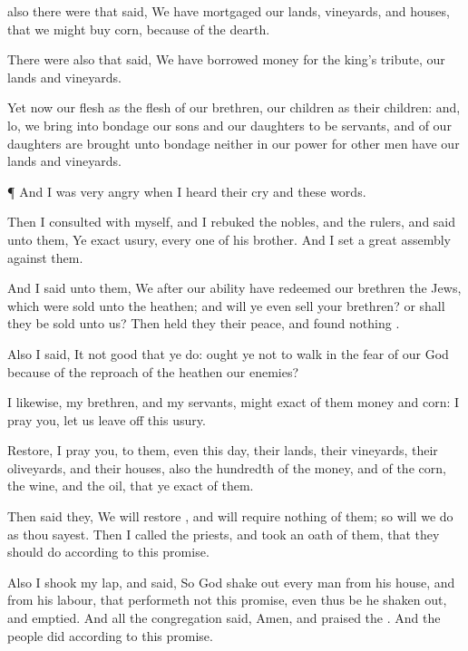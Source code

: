 { also there
were that
said, We have
mortgaged our
lands,
vineyards, and
houses, that we might
buy
corn, because of the
dearth.

There
were also that
said, We have
borrowed
money for the
king’s
tribute,
{} our
lands and
vineyards.

Yet now our
flesh
{} as the
flesh of our
brethren, our
children as their
children: and, lo, we bring into
bondage our
sons and our
daughters to be
servants, and
{} of our
daughters
are brought unto
bondage
{} neither
{} in our
power
{} for other
men have our
lands and
vineyards.


\par }{\PP {}¶ And I was
very
angry when I
heard their
cry and these
words.

Then I
consulted with
myself, and I
rebuked the
nobles, and the
rulers, and
said unto them, Ye
exact
usury, every
one of his
brother. And I
set a
great
assembly against them.

And I
said unto them, We after our
ability have
redeemed our
brethren the
Jews, which were
sold unto the
heathen; and will ye even
sell your
brethren? or shall they be
sold unto us? Then held they their
peace, and
found
nothing
{}.

Also I
said, It
{} not
good
that ye
do: ought ye not to
walk in the
fear of our
God because of the
reproach of the
heathen our
enemies?

I likewise,
{} my
brethren, and my
servants, might
exact of them
money and
corn: I pray you, let us leave
off this
usury.

Restore, I pray you, to them, even this
day, their
lands, their
vineyards, their
oliveyards, and their
houses, also the
hundredth
{} of the
money, and of the
corn, the
wine, and the
oil, that ye
exact of them.

Then
said they, We will
restore
{}, and will
require nothing of them; so will we
do as thou
sayest. Then I
called the
priests, and took an
oath of them, that they should
do according to this
promise.

Also I
shook my
lap, and
said, So
God shake
out every
man from his
house, and from his
labour, that
performeth not this
promise, even thus be he shaken
out, and
emptied. And all the
congregation
said,
Amen, and
praised the
{}. And the
people
did according to this
promise.


}
